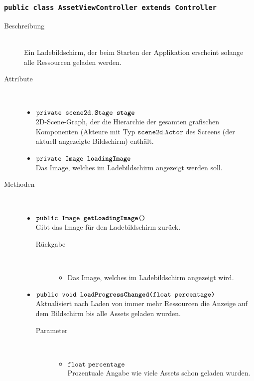 \subsubsection{\normalfont \texttt{public class \textbf{AssetViewController} extends Controller}}

\begin{description}
\item[Beschreibung] \hfill \\ Ein Ladebildschirm, der beim Starten der Applikation erscheint solange alle Ressourcen geladen werden.

\item[Attribute] \hfill \\
	\vspace{-.8cm}
	\begin{itemize}
		\item $\texttt{private scene2d.Stage \textbf{stage}}$ \\ 2D-Scene-Graph, der die Hierarchie der gesamten grafischen Komponenten (Akteure mit Typ $\texttt{scene2d.Actor}$ des Screens (der aktuell angezeigte Bildschirm) enthält. 
		\item $\texttt{private Image \textbf{loadingImage}}$ \\ Das Image, welches im Ladebildschirm angezeigt werden soll.
	\end{itemize}
	
\item[Methoden] \hfill \\
	\vspace{-.8cm}
	\begin{itemize}

		
		\item $\texttt{public Image \textbf{getLoadingImage}()}$ \\ Gibt das Image für den Ladebildschirm zurück.
		\begin{description}
			\item[Rückgabe] \hfill \\
			\vspace{-.8cm}
			\begin{itemize}
				\item Das Image, welches im Ladebildschirm angezeigt wird.
			\end{itemize}
		\end{description}

		\item $\texttt{public void \textbf{loadProgressChanged}(float percentage)}$ \\ Aktualisiert nach Laden von immer mehr Ressourcen die Anzeige auf dem Bildschirm bis alle Assets geladen wurden.
		\begin{description}
			\item[Parameter] \hfill \\
			\vspace{-.8cm}
			\begin{itemize}
				\item $\texttt{float percentage}$ \\ Prozentuale Angabe wie viele Assets schon geladen wurden.
			\end{itemize}
		\end{description}
				

\end{itemize}
\end{description}
